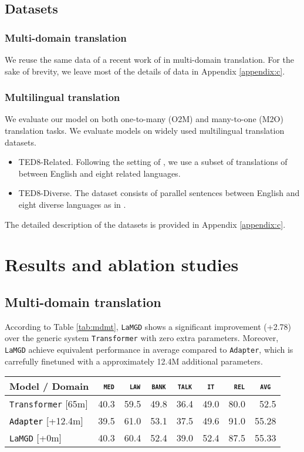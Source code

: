 \documentclass[11pt]{article}
\newcommand{\revision}[1]{\textcolor{black}{#1}}
\newcommand{\domain}[1]{\texttt{\textsc{#1}}}
\newcommand{\system}[1]{\texttt{{#1}}}
\begin{document}
\subsection{Datasets}
\subsubsection{Multi-domain translation}
We reuse the same data of a recent work of \citet{Pham21revisiting} in multi-domain translation. For the sake of brevity, we leave most of the details of data in Appendix \ref{appendix:c}.
\subsubsection{Multilingual translation}
We evaluate our model on both one-to-many (O2M) and many-to-one (M2O)
translation tasks. We evaluate models on widely used multilingual translation datasets.
\begin{itemize}
	\item TED8-Related. Following the setting of \citet{Wang20balancing}, we use a subset of translations of \citet{qi18when} between English and eight related languages.
	\item TED8-Diverse. The dataset consists of parallel sentences between English and eight diverse languages as in \citet{Wang20balancing}.
\end{itemize}
The detailed description of the datasets is provided in Appendix \ref{appendix:c}.
\section{Results and ablation studies}
\subsection{Multi-domain translation}
According to Table \ref{tab:mdmt}, \system{LaMGD} shows a significant improvement (+2.78) over the generic system \system{Transformer} with zero extra parameters. Moreover, \system{LaMGD} achieve equivalent performance in average compared to \system{Adapter}, which is carrefully finetuned with a approximately 12.4M additional parameters.
\begin{table*}[h!]
  \centering
  \begin{tabular}{|p{4cm}|*{7}{r|}} \hline
    Model / Domain & \multicolumn{1}{c|}{\domain{ med}} & \multicolumn{1}{c|}{\domain{ law}} & \multicolumn{1}{c|}{\domain{bank}} & \multicolumn{1}{c|}{\domain{talk}} & \multicolumn{1}{c|}{\domain{ it }} & \multicolumn{1}{c|}{\domain{ rel}} & \multicolumn{1}{c|}{\domain{avg}} \\ \hline 
    \system{Transformer}  \hfill{\footnotesize[65m]} & 40.3 & 59.5 & 49.8 & 36.4 & 49.0 & 80.0  & 52.5\\
    \revision{\system{Adapter}}   \hfill{\footnotesize[+12.4m]}  & 39.5 & 61.0 & 53.1 & 37.5 & 49.6 & 91.0 & 55.28 \\ 
    \system{LaMGD}   \hfill{\footnotesize[+0m]}  & 40.3 & 60.4 & 52.4 & 39.0 & 52.4 & 87.5 & 55.33 \\ 
    \hline
  \end{tabular}
  \caption{Multi-domain translation}
  \label{tab:mdmt}
\end{table*}
\end{document}

